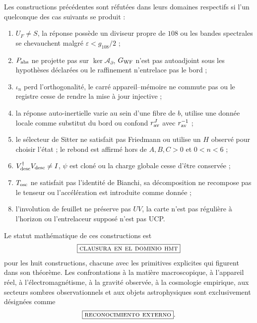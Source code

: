 Les constructions précédentes sont réfutées dans leurs domaines respectifs
si l'un quelconque des cas suivants se produit :

\begin{enumerate}
 \setlength{\itemsep}{0.15\baselineskip}
 \item \(U_F\neq S\), la réponse possède un diviseur propre de \(108\) ou les
 bandes spectrales se chevauchent malgré \(\varepsilon<g_{108}/2\) ;
 \item \(P_{\rm abs}\) ne projette pas sur
 \(\ker\mathcal A_\partial\), \(G_{\rm WF}\) n'est pas autoadjoint sous les
 hypothèses déclarées ou le raffinement n'entrelace pas le bord ;
 \item \(\iota_n\) perd l'orthogonalité, le carré appareil--mémoire ne
 commute pas ou le registre cesse de rendre la mise à jour injective ;
 \item la réponse auto-inertielle varie au sein d'une fibre de \(b\), utilise une
 donnée locale comme substitut du bord ou confond
 \(r_{\rm av}^J\) avec \(r_{\rm av}^{-1}\) ;
 \item le sélecteur de Sitter ne satisfait pas Friedmann ou utilise un \(H\) observé
 pour choisir l'état ; le rebond est affirmé hors de
 \(A,B,C>0\) et \(0<n<6\) ;
 \item \(V_{\rm desc}^{\dagger}V_{\rm desc}\neq I\), \(\psi\) est cloné ou
 la charge globale cesse d'être conservée ;
 \item \(T_{\rm osc}\) ne satisfait pas l'identité de Bianchi, sa
 décomposition ne recompose pas le tenseur ou l'accélération est introduite comme
 donnée ;
 \item l'involution de feuillet ne préserve pas \(UV\), la carte n'est pas régulière à
 l'horizon ou l'entrelaceur supposé n'est pas UCP.
\end{enumerate}


Le statut mathématique de ces constructions est
\[
 \boxed{\textsc{clausura en el dominio hmt}}
\]
pour les huit constructions, chacune avec les primitives explicites qui
figurent dans son théorème. Les confrontations à la matière macroscopique, à l'appareil
réel, à l'électromagnétisme, à la gravité observée, à la cosmologie empirique, aux secteurs
sombres observationnels et aux objets astrophysiques sont exclusivement désignées comme
\[
 \boxed{\textsc{reconocimiento externo}}.
\]
